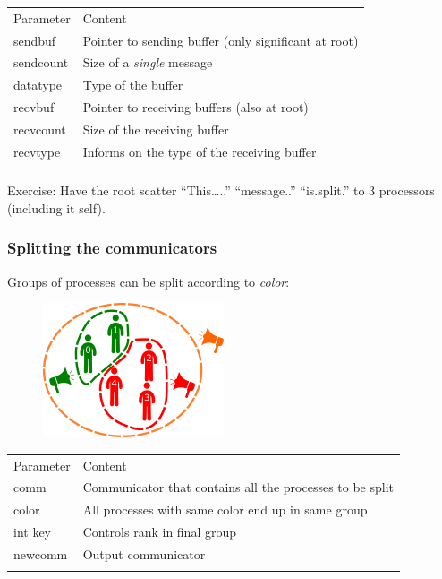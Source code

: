 \begin{longtable}[c]{@{}ll@{}}
\toprule\addlinespace
Parameter & Content
\\\addlinespace
\midrule\endhead
sendbuf & Pointer to sending buffer (only significant at root)
\\\addlinespace
sendcount & Size of a \emph{single} message
\\\addlinespace
datatype & Type of the buffer
\\\addlinespace
recvbuf & Pointer to receiving buffers (also at root)
\\\addlinespace
recvcount & Size of the receiving buffer
\\\addlinespace
recvtype & Informs on the type of the receiving buffer
\\\addlinespace
\bottomrule
\end{longtable}

Exercise: Have the root scatter ``This\ldots{}..'' ``message..''
``is.split.'' to 3 processors (including it self).

\subsubsection{Splitting the
communicators}\label{splitting-the-communicators}

Groups of processes can be split according to \emph{color}:

\begin{figure}[htbp]
\centering
\includegraphics{06MPI/figures/split.png}
\end{figure}

\begin{Shaded}
\begin{Highlighting}[]
   
\end{Highlighting}
\end{Shaded}

\begin{longtable}[c]{@{}ll@{}}
\toprule\addlinespace
Parameter & Content
\\\addlinespace
\midrule\endhead
comm & Communicator that contains all the processes to be split
\\\addlinespace
color & All processes with same color end up in same group
\\\addlinespace
int key & Controls rank in final group
\\\addlinespace
newcomm & Output communicator
\\\addlinespace
\bottomrule
\end{longtable}

